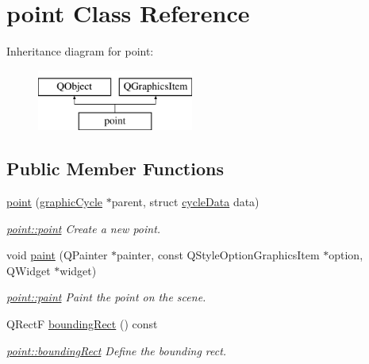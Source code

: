 \hypertarget{classpoint}{}\section{point Class Reference}
\label{classpoint}
Inheritance diagram for point\+:\begin{figure}[H]
\begin{center}
\leavevmode
\includegraphics[height=2.000000cm]{classpoint}
\end{center}
\end{figure}
\subsection*{Public Member Functions}
\begin{DoxyCompactItemize}
\item 
\mbox{\hyperlink{classpoint_a7284d568deda3fe4a7a81cf9faae05a3}{point}} (\mbox{\hyperlink{classgraphic_cycle}{graphic\+Cycle}} $\ast$parent, struct \mbox{\hyperlink{structcycle_data}{cycle\+Data}} data)
\begin{DoxyCompactList}\small\item\em \mbox{\hyperlink{classpoint_a7284d568deda3fe4a7a81cf9faae05a3}{point\+::point}} Create a new point. \end{DoxyCompactList}\item 
void \mbox{\hyperlink{classpoint_a3ab3bdc06b67f1004fdddc7a3f73835a}{paint}} (Q\+Painter $\ast$painter, const Q\+Style\+Option\+Graphics\+Item $\ast$option, Q\+Widget $\ast$widget)
\begin{DoxyCompactList}\small\item\em \mbox{\hyperlink{classpoint_a3ab3bdc06b67f1004fdddc7a3f73835a}{point\+::paint}} Paint the point on the scene. \end{DoxyCompactList}\item 
Q\+RectF \mbox{\hyperlink{classpoint_a91a81fc826052833e19e9d39ef3849d9}{bounding\+Rect}} () const
\begin{DoxyCompactList}\small\item\em \mbox{\hyperlink{classpoint_a91a81fc826052833e19e9d39ef3849d9}{point\+::bounding\+Rect}} Define the bounding rect. \end{DoxyCompactList}\end{DoxyCompactItemize}


